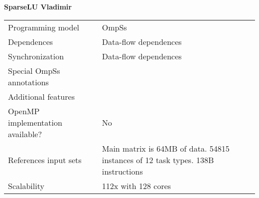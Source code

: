 \section*{}
\label{sparselu_vladimir}
\centering
\Huge
\textbf{SparseLU Vladimir}

\begin{table}[h!]
  \large
  \centering
  \begin{tabular}{|l|l|}
    \hline
    Programming model                & OmpSs \\
    Dependences                      & Data-flow dependences \\
    Synchronization                  & Data-flow dependences \\
    Special OmpSs annotations        &  \\
    Additional features              &  \\
    OpenMP implementation available? & No \\
    References input sets            & Main matrix is 64MB of data. 54815 instances of 12 task types. 138B instructions \\
    Scalability                      & 112x with 128 cores \\
    \hline
  \end{tabular}
\end{table}

\newpage

